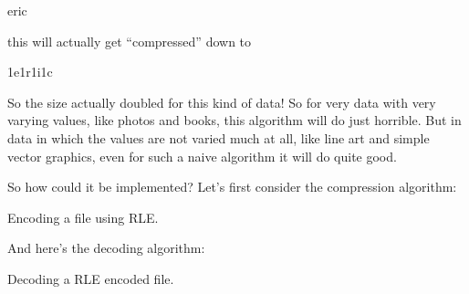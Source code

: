 \begin{refsection}
\begin{indentpar}
  eric
\end{indentpar}

this will actually get ``compressed'' down to

\begin{indentpar}
  1e1r1i1c
\end{indentpar}

So the size actually doubled for this kind of data! So for very data
with very varying values, like photos and books, this algorithm will
do just horrible. But in data in which the values are not varied much
at all, like line art and simple vector graphics, even for such a
naive algorithm it will do quite good.

So how could it be implemented? Let's first consider the compression algorithm:


\begin{algorithm}
  \caption{Encoding a file using RLE.}
  \label{alg:rle-enc}
  \begin{algorithmic}[1]
     
     
        \Else
          \State {}
          \State {}
        \EndIf
      \EndIf
    \EndWhile
      \State {}
      \State {}
    \EndIf
  \end{algorithmic}
\end{algorithm}

And here's the decoding algorithm:

\begin{algorithm}
  \caption{Decoding a RLE encoded file.}
  \label{alg:rle-dec}
  \begin{algorithmic}[1]
     

     
     
      \Else
          \State {}
        \EndRepeat
      \EndIf
    \EndWhile
  \end{algorithmic}
\end{algorithm}


\printbibliography[heading=subbibliography]

\end{refsection}